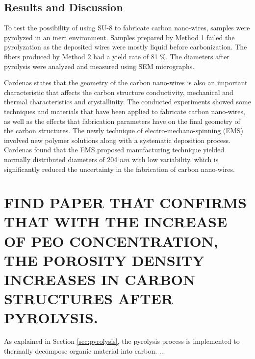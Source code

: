 \subsection{Results and Discussion}
To test the possibility of using SU-8 to fabricate carbon nano-wires, samples were pyrolyzed in an inert environment. Samples prepared by Method 1 failed the pyrolyzation as the deposited wires were mostly liquid before carbonization. The fibers produced by Method 2 had a yield rate of 81 $\%$. The diameters after pyrolysis were analyzed and measured using SEM micrographs.

Cardenas \cite{Cardenas2017} states that the geometry of the carbon nano-wires is also an important characteristic that affects the carbon structure conductivity, mechanical and thermal characteristics and crystallinity. The conducted experiments showed some techniques and materials that have been applied to fabricate carbon nano-wires, as well as the effects that fabrication parameters have on the final geometry of the carbon structures. The newly technique of electro-mechano-spinning (EMS) involved new polymer solutions along with a systematic deposition process. Cardenas found that the EMS proposed manufacturing technique yielded normally distributed diameters of 204 $nm$ with low variability, which is significantly reduced the uncertainty in the fabrication of carbon nano-wires.

\clearpage

\section{FIND PAPER THAT CONFIRMS THAT WITH THE INCREASE OF PEO CONCENTRATION, THE POROSITY DENSITY INCREASES IN CARBON STRUCTURES AFTER PYROLYSIS. \cite{newPAPER}}

As explained in Section \ref{sec:pyrolysis}, the pyrolysis process is implemented to thermally decompose organic material into carbon. ...



